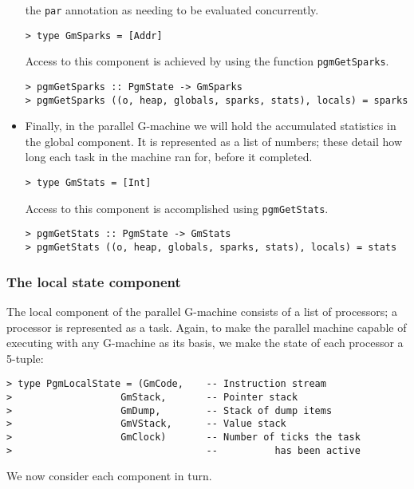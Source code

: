 \begin{itemize}
the \mbox{\tt par} annotation as needing to be evaluated concurrently.
\begin{verbatim}
> type GmSparks = [Addr]
\end{verbatim}
%
Access to this component is achieved by using the function
\mbox{\tt pgmGetSparks}.
\begin{verbatim}
> pgmGetSparks :: PgmState -> GmSparks
> pgmGetSparks ((o, heap, globals, sparks, stats), locals) = sparks
\end{verbatim}
%
%
\item Finally, in the parallel G-machine we will hold the accumulated
statistics in the global component. It is represented as a list of
numbers; these detail how long each task in the machine ran for,
before it completed.
\begin{verbatim}
> type GmStats = [Int]
\end{verbatim}
%
Access to this component is accomplished using \mbox{\tt pgmGetStats}.
\begin{verbatim}
> pgmGetStats :: PgmState -> GmStats
> pgmGetStats ((o, heap, globals, sparks, stats), locals) = stats
\end{verbatim}
%
%
\end{itemize}

\subsubsection{The local state component}

The local component of the parallel G-machine consists of a list of
processors; a processor is represented as a task. Again, to make the
parallel machine capable of executing with any G-machine as its basis,
we make the state of each processor a 5-tuple:

\begin{verbatim}
> type PgmLocalState = (GmCode,    -- Instruction stream
>                   GmStack,       -- Pointer stack
>                   GmDump,        -- Stack of dump items
>                   GmVStack,      -- Value stack
>                   GmClock)       -- Number of ticks the task
>                                  --          has been active
\end{verbatim}
%
We now consider each component in turn.

